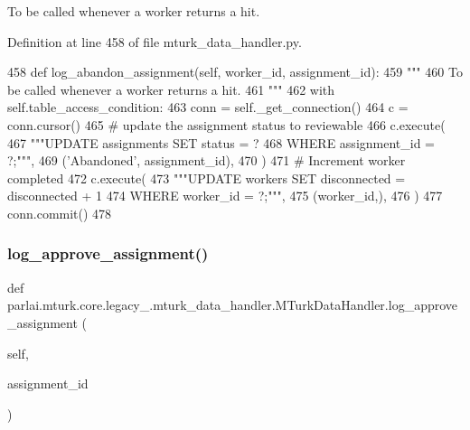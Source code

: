 \begin{DoxyVerb}To be called whenever a worker returns a hit.
\end{DoxyVerb}
 

Definition at line 458 of file mturk\+\_\+data\+\_\+handler.\+py.


\begin{DoxyCode}
458     \textcolor{keyword}{def }log\_abandon\_assignment(self, worker\_id, assignment\_id):
459         \textcolor{stringliteral}{"""}
460 \textcolor{stringliteral}{        To be called whenever a worker returns a hit.}
461 \textcolor{stringliteral}{        """}
462         with self.table\_access\_condition:
463             conn = self.\_get\_connection()
464             c = conn.cursor()
465             \textcolor{comment}{# update the assignment status to reviewable}
466             c.execute(
467                 \textcolor{stringliteral}{"""UPDATE assignments SET status = ?}
468 \textcolor{stringliteral}{                         WHERE assignment\_id = ?;"""},
469                 (\textcolor{stringliteral}{'Abandoned'}, assignment\_id),
470             )
471             \textcolor{comment}{# Increment worker completed}
472             c.execute(
473                 \textcolor{stringliteral}{"""UPDATE workers SET disconnected = disconnected + 1}
474 \textcolor{stringliteral}{                         WHERE worker\_id = ?;"""},
475                 (worker\_id,),
476             )
477             conn.commit()
478 
\end{DoxyCode}
\mbox{\label{classparlai_1_1mturk_1_1core_1_1legacy__2018_1_1mturk__data__handler_1_1MTurkDataHandler_ae56cf103d88b3fda36a51ffc0534c184}} 
\subsubsection{\texorpdfstring{log\+\_\+approve\+\_\+assignment()}{log\_approve\_assignment()}}
{\footnotesize\ttfamily def parlai.\+mturk.\+core.\+legacy\+\_.\+mturk\+\_\+data\+\_\+handler.\+M\+Turk\+Data\+Handler.\+log\+\_\+approve\+\_\+assignment (\begin{DoxyParamCaption}\item[{}]{self,  }\item[{}]{assignment\+\_\+id }\end{DoxyParamCaption})}

